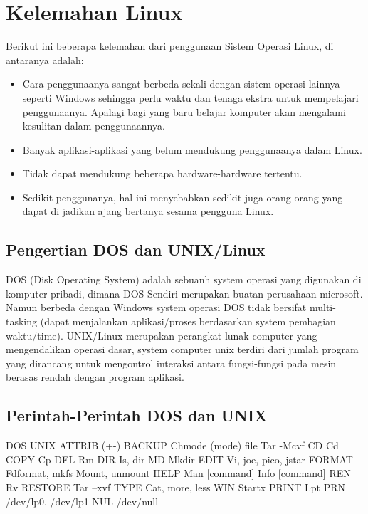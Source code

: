 \section{Kelemahan Linux}

Berikut ini beberapa kelemahan dari penggunaan Sistem Operasi Linux, di antaranya adalah:

\begin{itemize}

\item Cara penggunaanya sangat berbeda sekali dengan sistem operasi lainnya seperti Windows sehingga perlu waktu dan tenaga ekstra untuk mempelajari penggunaanya. Apalagi bagi yang baru belajar komputer akan mengalami kesulitan dalam penggunaannya.

\item Banyak aplikasi-aplikasi yang belum mendukung penggunaanya dalam Linux.

\item Tidak dapat mendukung beberapa hardware-hardware tertentu.

\item Sedikit penggunanya, hal ini menyebabkan sedikit juga orang-orang yang dapat di jadikan ajang bertanya sesama pengguna Linux.

\end{itemize}

\subsection{Pengertian DOS dan UNIX/Linux}
DOS (Disk Operating System) adalah sebuanh system operasi yang digunakan di komputer pribadi, dimana DOS Sendiri merupakan buatan perusahaan microsoft. Namun berbeda dengan Windows system operasi DOS tidak bersifat multi-tasking (dapat menjalankan aplikasi/proses berdasarkan system pembagian waktu/time).
UNIX/Linux merupakan perangkat lunak computer yang mengendalikan operasi dasar, system computer unix terdiri dari jumlah program yang dirancang untuk mengontrol interaksi antara fungsi-fungsi pada mesin berasas rendah dengan program aplikasi.
\subsection{Perintah-Perintah DOS dan UNIX}
DOS	UNIX
ATTRIB (+-)
BACKUP	Chmode (mode) file
Tar -Mcvf
CD	Cd
COPY	Cp
DEL	Rm
DIR	Is, dir
MD	Mkdir
EDIT	Vi, joe, pico, jstar
FORMAT	Fdformat, mkfs
Mount, unmount
HELP	Man [command]
Info [command]
REN	Rv
RESTORE	Tar –xvf
TYPE	Cat, more, less
WIN	Startx
PRINT	Lpt
PRN	/dev/lp0. /dev/lp1
NUL	/dev/null
